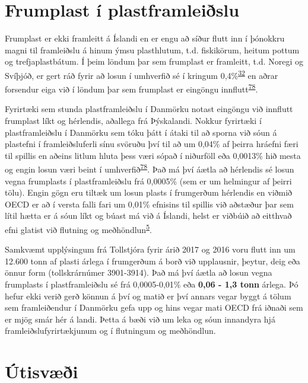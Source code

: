 \documentclass[icelandic,]{book}
\begin{document}
\hypertarget{frumplast-i-plastframleislu}{%
\section*{Frumplast í plastframleiðslu}\label{frumplast-i-plastframleislu}}

Frumplast er ekki framleitt á Íslandi en er engu að síður flutt inn í þónokkru magni til framleiðslu á hinum ýmsu plasthlutum, t.d. fiskikörum, heitum pottum og trefjaplastbátum. Í þeim löndum þar sem frumplast er framleitt, t.d. Noregi og Svíþjóð, er gert ráð fyrir að losun í umhverfið sé í kringum 0,4\%\textsuperscript{\protect\hyperlink{ref-sundt2014sources}{32}} en aðrar forsendur eiga við í löndum þar sem frumplast er eingöngu innflutt\textsuperscript{\protect\hyperlink{ref-lassen2015microplastics}{78}}.

Fyrirtæki sem stunda plastframleiðslu í Danmörku notast eingöngu við innflutt frumplast líkt og hérlendis, aðallega frá Þýskalandi. Nokkur fyrirtæki í plastframleiðslu í Danmörku sem tóku þátt í átaki til að sporna við sóun á plastefni í framleiðsluferli sínu svöruðu því til að um 0,04\% af þeirra hráefni færi til spillis en aðeins litlum hluta þess væri sópað í niðurföll eða 0,0013\% hið mesta og engin losun væri beint í umhverfið\textsuperscript{\protect\hyperlink{ref-lassen2015microplastics}{78}}. Það má því áætla að hérlendis sé losun vegna frumplasts í plastframleiðslu frá 0,0005\% (sem er um helmingur af þeirri tölu). Engin gögn eru tiltæk um losun plasts í frumgerðum hérlendis en viðmið OECD er að í versta falli fari um 0,01\% efnisins til spillis við aðstæður þar sem lítil hætta er á sóun líkt og búast má við á Íslandi, helst er viðbúið að eitthvað efni glatist við flutning og meðhöndlun\textsuperscript{\protect\hyperlink{ref-OECD2009}{5}}.

Samkvæmt upplýsingum frá Tollstjóra fyrir árið 2017 og 2016 voru flutt inn um 12.600 tonn af plasti árlega í frumgerðum á borð við upplausnir, þeytur, deig eða önnur form (tollskrárnúmer 3901-3914). Það má því áætla að losun vegna frumplasts í plastframleiðslu sé frá 0,0005-0,01\% eða \textbf{0,06 - 1,3 tonn} árlega. Þó hefur ekki verið gerð könnun á því og matið er því annars vegar byggt á tölum sem framleiðendur í Danmörku gefa upp og hins vegar mati OECD frá iðnaði sem er mjög smár hér á landi. Þetta á bæði við um leka og sóun innandyra hjá framleiðslufyrirtækjunum og í flutningum og meðhöndlun.

\hypertarget{utisvi}{%
\section*{Útisvæði}\label{utisvi}}
\end{document}
